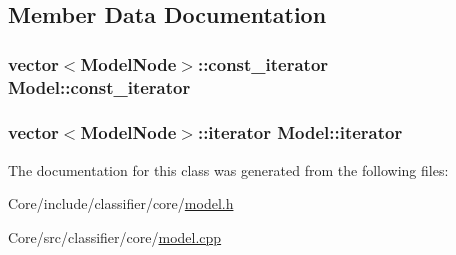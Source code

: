 \subsection{Member Data Documentation}
\hypertarget{classModel_a578f203623cdda48b577f10a8d6e12d4}{
\subsubsection[{const\+\_\+iterator}]{\setlength{\rightskip}{0pt plus 5cm}vector$<$Model\+Node$>$\+::const\+\_\+iterator Model\+::const\+\_\+iterator}}\label{classModel_a578f203623cdda48b577f10a8d6e12d4}
\hypertarget{classModel_a0cfbe847990e80cb9033e8a3257bced2}{
\subsubsection[{iterator}]{\setlength{\rightskip}{0pt plus 5cm}vector$<$Model\+Node$>$\+::iterator Model\+::iterator}}\label{classModel_a0cfbe847990e80cb9033e8a3257bced2}


The documentation for this class was generated from the following files\+:\begin{DoxyCompactItemize}
\item 
Core/include/classifier/core/\hyperlink{model_8h}{model.\+h}\item 
Core/src/classifier/core/\hyperlink{model_8cpp}{model.\+cpp}\end{DoxyCompactItemize}
